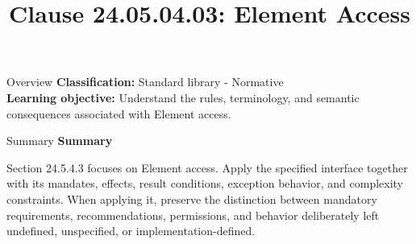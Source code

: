 \documentclass[10pt,letterpaper]{article}
\title{Clause 24.05.04.03: Element Access}
\author{}
\date{}
\begin{document}
\maketitle
\begin{CornellOverviewBox}{Overview}
\textbf{Classification:} Standard library - Normative\\[2pt]
\textbf{Learning objective:} Understand the rules, terminology, and semantic consequences associated with Element access.
\end{CornellOverviewBox}\begin{CornellSummaryBox}{Summary}
{\sffamily\bfseries\color{Accent} Summary}\par\vspace{3pt}Section 24.5.4.3 focuses on Element access. Apply the specified interface together with its mandates, effects, result conditions, exception behavior, and complexity constraints. When applying it, preserve the distinction between mandatory requirements, recommendations, permissions, and behavior deliberately left undefined, unspecified, or implementation-defined.
\end{CornellSummaryBox}
\end{document}

